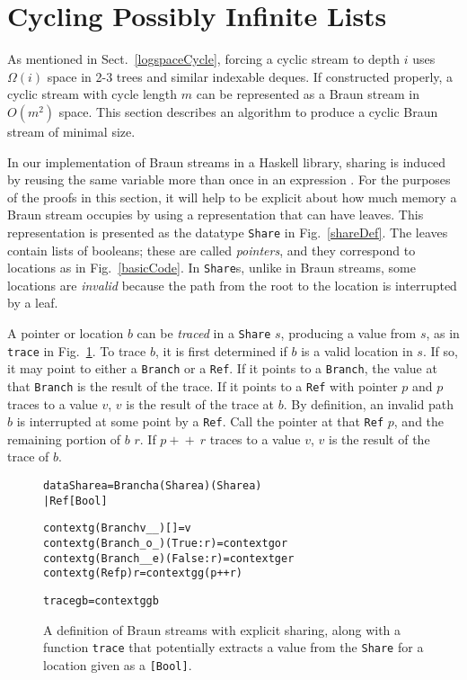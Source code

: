 \documentclass[envcountsect]{llncs}
\newcommand{\app}{+\!\!\!+\ }
\newcommand{\share}{{\tt Share} }
\begin{document}
\section{Cycling Possibly Infinite Lists}
\label{cycleSect}

As mentioned in Sect.~\ref{logspaceCycle}, forcing a cyclic stream to depth $i$ uses $\Omega(i)$ space in 2-3 trees and similar indexable deques.
If constructed properly, a cyclic stream with cycle length $m$ can be represented as a Braun stream in $O(m^2)$ space.
This section describes an algorithm to produce a cyclic Braun stream of minimal size.

In our implementation of Braun streams in a Haskell library, sharing is induced by reusing the same variable more than once in an expression \cite{website}.
For the purposes of the proofs in this section, it will help to be explicit about how much memory a Braun stream occupies by using a representation that can have leaves.
This representation is presented as the datatype {\tt Share} in Fig.~\ref{shareDef}.
The leaves contain lists of booleans; these are called {\em pointers}, and they correspond to locations as in Fig.~\ref{basicCode}.
In {\tt Share}s, unlike in Braun streams, some locations are {\em invalid} because the path from the root to the location is interrupted by a leaf.

A pointer or location $b$ can be {\em traced} in a \share $s$, producing a value from $s$, as in {\tt trace} in Fig.~\ref{traceDef}.
To trace $b$, it is first determined if $b$ is a valid location in $s$.
If so, it may point to either a {\tt Branch} or a {\tt Ref}.
If it points to a {\tt Branch}, the value at that {\tt Branch} is the result of the trace.
If it points to a {\tt Ref} with pointer $p$ and $p$ traces to a value $v$, $v$ is the result of the trace at $b$.
By definition, an invalid path $b$ is interrupted at some point by a {\tt Ref}.
Call the pointer at that {\tt Ref} $p$, and the remaining portion of $b$ $r$.
If $p \app r$ traces to a value $v$, $v$ is the result of the trace of $b$.

\begin{figure}
\begin{alltt}
data Share a = Branch a (Share a) (Share a)
             | Ref [Bool]


context g (Branch v _ _) [] = v
context g (Branch _ o _) (True:r) = context g o r
context g (Branch _ _ e) (False:r) = context g e r
context g (Ref p) r = context g g (p++r)

trace g b = context g g b
\end{alltt}
\caption{A definition of Braun streams with explicit sharing, along with a function {\tt trace} that potentially extracts a value from the {\tt Share} for a location given as a {\tt [Bool]}.}
\label{shareDef}
\label{traceDef}
\end{figure}
\end{document}

